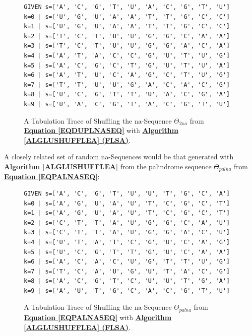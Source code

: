 \documentclass[a4paper, 18pt]{book} %
\begin{document}
\begin{figure}[H]
  \begin{center}
\Large
\begin{verbatim}
GIVEN s=['A', 'C', 'G', 'T', 'U', 'A', 'C', 'G', 'T', 'U']
k=0 | s=['U', 'G', 'U', 'A', 'A', 'T', 'T', 'G', 'C', 'C']
k=1 | s=['U', 'G', 'U', 'A', 'A', 'T', 'T', 'G', 'C', 'C']
k=2 | s=['T', 'C', 'T', 'U', 'U', 'G', 'G', 'C', 'A', 'A']
k=3 | s=['T', 'C', 'T', 'U', 'U', 'G', 'G', 'A', 'C', 'A']
k=4 | s=['A', 'T', 'A', 'C', 'C', 'G', 'U', 'T', 'U', 'G']
k=5 | s=['A', 'C', 'G', 'C', 'T', 'G', 'U', 'T', 'U', 'A']
k=6 | s=['A', 'T', 'U', 'C', 'A', 'G', 'C', 'T', 'U', 'G']
k=7 | s=['T', 'T', 'U', 'U', 'G', 'A', 'C', 'A', 'C', 'G']
k=8 | s=['U', 'C', 'G', 'T', 'T', 'U', 'A', 'C', 'G', 'A']
k=9 | s=['U', 'A', 'C', 'G', 'T', 'A', 'C', 'G', 'T', 'U']
\end{verbatim}

   \caption{A Tabulation Trace of Shuffling the na-Sequence $\Theta_{2na}$ from \textbf{\hyperref[EQDUPLNASEQ]{Equation \ref{EQDUPLNASEQ}}} with \textbf{\hyperref[ALGLUSHUFFLEA]{Algorithm \ref{ALGLUSHUFFLEA} (FLSA)}}.}
  \label{FIGTRACEFLSA2NA}
  \end{center}
\end{figure}

A closely related set of random na-Sequences would be that generated with \textbf{\hyperref[ALGLUSHUFFLEA]{Algorithm \ref{ALGLUSHUFFLEA}}} from the palindrome sequence $\Theta_{palna}$ from \textbf{\hyperref[EQPALNASEQ]{Equation \ref{EQPALNASEQ}}}:


\begin{figure}[H]
  \begin{center}
\Large
\begin{verbatim}
GIVEN s=['A', 'C', 'G', 'T', 'U', 'U', 'T', 'G', 'C', 'A']
k=0 | s=['A', 'G', 'U', 'A', 'U', 'T', 'C', 'G', 'C', 'T']
k=1 | s=['A', 'G', 'U', 'A', 'U', 'T', 'C', 'G', 'C', 'T']
k=2 | s=['C', 'T', 'T', 'A', 'U', 'G', 'G', 'C', 'A', 'U']
k=3 | s=['C', 'T', 'T', 'A', 'U', 'G', 'G', 'A', 'C', 'U']
k=4 | s=['U', 'T', 'A', 'T', 'C', 'G', 'U', 'C', 'A', 'G']
k=5 | s=['U', 'C', 'G', 'T', 'T', 'G', 'U', 'C', 'A', 'A']
k=6 | s=['A', 'C', 'A', 'C', 'U', 'G', 'T', 'T', 'U', 'G']
k=7 | s=['T', 'C', 'A', 'U', 'G', 'U', 'T', 'A', 'C', 'G']
k=8 | s=['A', 'C', 'G', 'T', 'C', 'U', 'U', 'T', 'G', 'A']
k=9 | s=['A', 'U', 'T', 'G', 'C', 'A', 'C', 'G', 'T', 'U']
\end{verbatim}

   \caption{A Tabulation Trace of Shuffling the na-Sequence $\Theta_{palna}$ from \textbf{\hyperref[EQPALNASEQ]{Equation \ref{EQPALNASEQ}}} with \textbf{\hyperref[ALGLUSHUFFLEA]{Algorithm \ref{ALGLUSHUFFLEA} (FLSA)}}.}
  \label{FIGTRACEFLSAPALNA}
  \end{center}
\end{figure}
\end{document}
